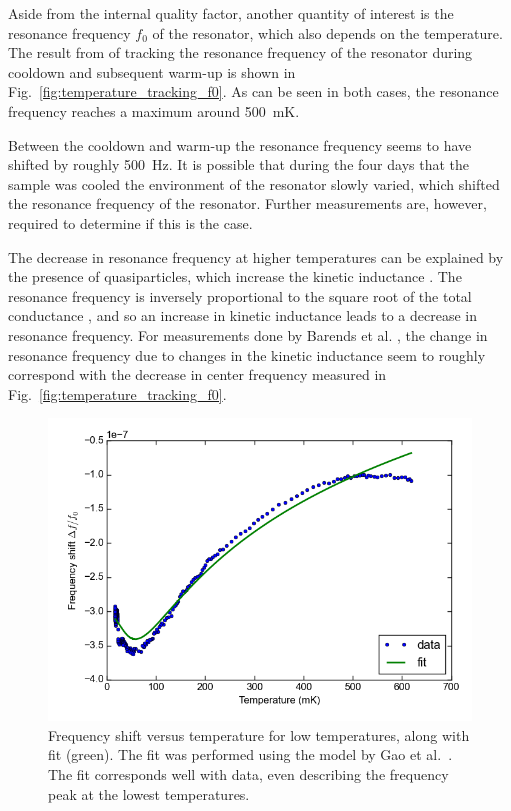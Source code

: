 Aside from the internal quality factor, another quantity of interest is the resonance frequency $f_0$ of the resonator, which also depends on the temperature. The result from of tracking the resonance frequency of the resonator during cooldown and subsequent warm-up is shown in Fig.~\ref{fig:temperature_tracking_f0}. As can be seen in both cases, the resonance frequency reaches a maximum around \SI{500}{\milli \kelvin}.

Between the cooldown and warm-up the resonance frequency seems to have shifted by roughly \SI{500}{Hz}. It is possible that during the four days that the sample was cooled the environment of the resonator slowly varied, which shifted the resonance frequency of the resonator. Further measurements are, however, required to determine if this is the case.

The decrease in resonance frequency at higher temperatures can be explained by the presence of quasiparticles, which increase the kinetic inductance \cite[p91]{Geerlings}. The resonance frequency is inversely proportional to the square root of the total conductance \cite{barends2008contribution}, and so an increase in kinetic inductance leads to a decrease in resonance frequency. For measurements done by Barends et al. \cite{barends2008contribution}, the change in resonance frequency due to changes in the kinetic inductance seem to roughly correspond with the decrease in center frequency measured in Fig.~\ref{fig:temperature_tracking_f0}.

\begin{figure}[h]
    \centering
    \includegraphics[width=.7\textwidth]{Figures/DRIE/Temperature increase tracking - f0 vs T with fit.png}
    \caption{Frequency shift versus temperature for low temperatures, along with fit (green). The fit was performed using the model by Gao et al.~\cite{gao2008experimental}. The fit corresponds well with data, even describing the frequency peak at the lowest temperatures.}
    \label{fig:f0_vs_T_with_fit}
\end{figure}

